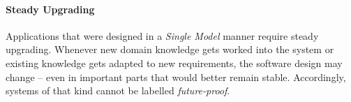 %
%
%
%
%
%
%

\paragraph{Steady Upgrading}
\label{steady_upgrading_heading}

Applications that were designed in a \emph{Single Model} manner require steady
upgrading. Whenever new domain knowledge gets worked into the system or
existing knowledge gets adapted to new requirements, the software design may
change -- even in important parts that would better remain stable. Accordingly,
systems of that kind cannot be labelled \emph{future-proof}.
